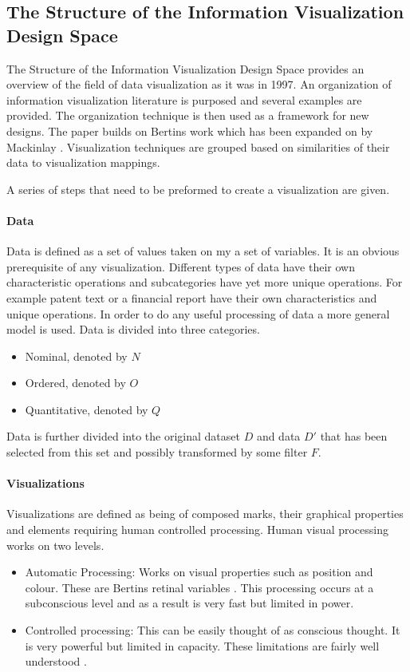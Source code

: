 \documentclass[a4paper, 11pt, titlepage, onehalfspacing]{report}
\begin{document}
		\subsection{The Structure of the Information Visualization Design Space}

The Structure of the Information Visualization Design Space provides an overview of the field of data visualization as it was in 1997. An organization of information visualization literature is purposed and several examples are provided. The organization technique is then used as a framework for new designs. The paper builds on Bertins work \cite{bertin1973semiologie} which has been expanded on by Mackinlay \cite{mackinlay1986automating}. Visualization techniques are grouped based on similarities of their data to visualization mappings.

A series of steps that need to be preformed to create a visualization are given. 

\paragraph{Data}
Data is defined as a set of values taken on my a set of variables. It is an obvious prerequisite of any visualization. Different types of data have their own characteristic operations and subcategories have yet more unique operations. For example patent text or a financial report have their own characteristics and unique operations. In order to do any useful processing of data a more general model is used. Data is divided into three categories.
\begin{itemize}
\item Nominal, denoted by $N$
\item Ordered, denoted by $O$
\item Quantitative, denoted by $Q$
\end{itemize}
Data is further divided into the original dataset $D$ and data $D'$ that has been selected from this set and possibly transformed by some filter $F$.

\paragraph{Visualizations}
Visualizations are defined as being of composed marks, their graphical properties and elements requiring human controlled processing. Human visual processing works on two levels.
\begin{itemize}
\item Automatic Processing: Works on visual properties such as position and colour. These are Bertins retinal variables \cite{bertin1973semiologie}. This processing occurs at a subconscious level and as a result is very fast but limited in power.
\item Controlled processing: This can be easily thought of as conscious thought. It is very powerful but limited in capacity. These limitations are fairly well understood \cite{Mil56}.
\end{itemize}
\end{document}
